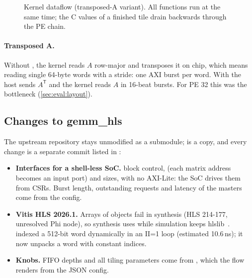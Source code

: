 \begin{figure}[t]
  \centering
  \resizebox{\linewidth}{!}{}
  \caption{Kernel dataflow (transposed-A variant). All functions run at the same time; the C values of a finished
    tile drain backwards through the PE chain.}
  \label{fig:kernel}
\end{figure}

\paragraph{Transposed A.} Without , the kernel reads \(A\) row-major and transposes it on chip,
which means reading single 64-byte words with a stride: one AXI burst per word. With  the host
sends \(A^\mathsf{T}\) and the kernel reads \(A\) in 16-beat bursts. For PE 32 this was the bottleneck
(\cref{sec:eval:layout}).

\subsection{Changes to gemm\_hls}
The upstream repository stays unmodified as a submodule;  is a copy, and every change is a
separate commit listed in :
\begin{itemize}
  \item \textbf{Interfaces for a shell-less SoC.}  block control, 
        (each matrix address becomes an input port) and  sizes, with no AXI-Lite: the SoC drives
        them from CSRs. Burst length, outstanding requests and latency of the masters come from the config.
  \item \textbf{Vitis HLS 2026.1.} Arrays of  objects fail in synthesis (HLS 214-177, unresolved
        Phi node), so synthesis uses  while simulation keeps hlslib~\cite{hlslib}.
         indexed a 512-bit word dynamically in an II=1 loop (estimated 10.6\,ns); it now
        unpacks a word with constant indices.
  \item \textbf{Knobs.} FIFO depths and all tiling parameters come from , which the flow renders
        from the JSON config.
\end{itemize}

